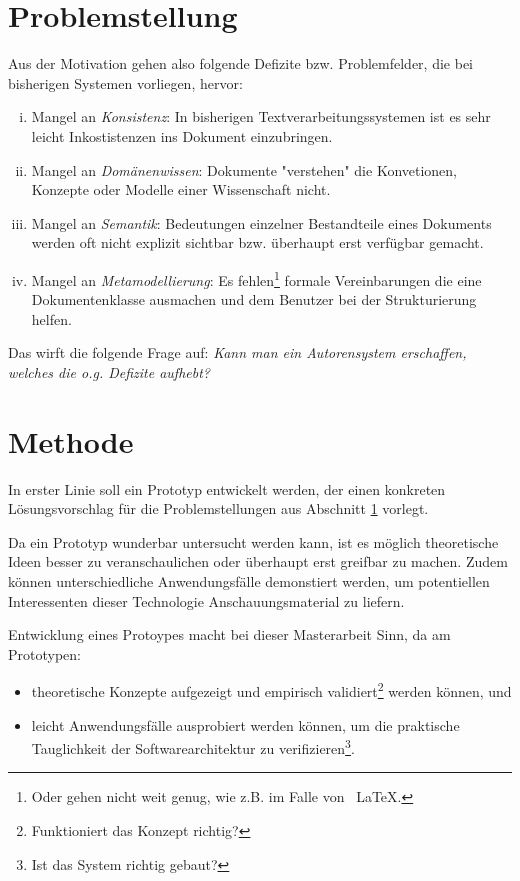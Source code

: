 \section{Problemstellung}\label{sec.problemstellung}

Aus der Motivation gehen also folgende Defizite bzw. Problemfelder, die bei
bisherigen Systemen vorliegen, hervor:

\begin{enumerate}[(i)]
  \item Mangel an \emph{Konsistenz}: In bisherigen Textverarbeitungssystemen ist es sehr leicht Inkostistenzen ins Dokument einzubringen.
  \item Mangel an \emph{Domänenwissen}: Dokumente "verstehen" die Konvetionen, Konzepte oder Modelle einer Wissenschaft nicht.
  \item Mangel an \emph{Semantik}: Bedeutungen einzelner Bestandteile eines Dokuments werden oft nicht explizit sichtbar bzw. überhaupt erst verfügbar gemacht.
  \item Mangel an \emph{Metamodellierung}: Es fehlen\footnote{Oder gehen nicht weit genug, wie z.B. im Falle von ~\LaTeX.} formale Vereinbarungen die eine Dokumentenklasse ausmachen und dem Benutzer bei der Strukturierung helfen.
\end{enumerate}

Das wirft die folgende Frage auf:
\emph{Kann man ein Autorensystem erschaffen,
welches die o.g. Defizite aufhebt?}


\section{Methode}

In erster Linie soll ein Prototyp entwickelt werden, der einen konkreten Lösungsvorschlag
für die Problemstellungen aus Abschnitt \ref{sec.problemstellung} vorlegt.

Da ein Prototyp wunderbar untersucht werden kann, ist es möglich theoretische Ideen
besser zu veranschaulichen oder überhaupt erst greifbar zu machen.
Zudem können unterschiedliche Anwendungsfälle demonstiert werden, um potentiellen Interessenten
dieser Technologie Anschauungsmaterial zu liefern.

Entwicklung eines Protoypes macht bei dieser Masterarbeit Sinn, da am Prototypen:

\begin{itemize}
  \item theoretische Konzepte aufgezeigt und empirisch validiert\footnote{Funktioniert das Konzept richtig?} werden können, und
  \item leicht Anwendungsfälle ausprobiert werden können, um die praktische Tauglichkeit der Softwarearchitektur zu verifizieren\footnote{Ist das System richtig gebaut?}.
\end{itemize}

